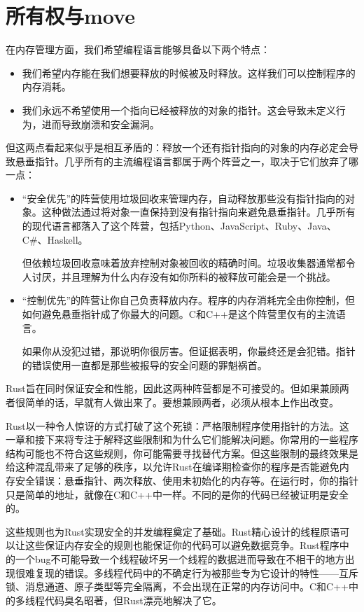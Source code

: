 \chapter{所有权与move}\label{ch04}

在内存管理方面，我们希望编程语言能够具备以下两个特点：
\begin{itemize}
    \item 我们希望内存能在我们想要释放的时候被及时释放。这样我们可以控制程序的内存消耗。
    \item 我们永远不希望使用一个指向已经被释放的对象的指针。这会导致未定义行为，进而导致崩溃和安全漏洞。
\end{itemize}

但这两点看起来似乎是相互矛盾的：释放一个还有指针指向的对象的内存必定会导致悬垂指针。几乎所有的主流编程语言都属于两个阵营之一，取决于它们放弃了哪一点：
\begin{itemize}
    \item “安全优先”的阵营使用垃圾回收来管理内存，自动释放那些没有指针指向的对象。这种做法通过将对象一直保持到没有指针指向来避免悬垂指针。几乎所有的现代语言都落入了这个阵营，包括Python、JavaScript、Ruby、Java、C\#、Haskell。

    但依赖垃圾回收意味着放弃控制对象被回收的精确时间。垃圾收集器通常都令人讨厌，并且理解为什么内存没有如你所料的被释放可能会是一个挑战。

    \item “控制优先”的阵营让你自己负责释放内存。程序的内存消耗完全由你控制，但如何避免悬垂指针成了你最大的问题。C和C++是这个阵营里仅有的主流语言。

    如果你从没犯过错，那说明你很厉害。但证据表明，你最终还是会犯错。指针的错误使用一直都是那些被报导的安全问题的罪魁祸首。
\end{itemize}

Rust旨在同时保证安全和性能，因此这两种阵营都是不可接受的。但如果兼顾两者很简单的话，早就有人做出来了。要想兼顾两者，必须从根本上作出改变。

Rust以一种令人惊讶的方式打破了这个死锁：严格限制程序使用指针的方法。这一章和接下来将专注于解释这些限制和为什么它们能解决问题。你常用的一些程序结构可能也不符合这些规则，你可能需要寻找替代方案。但这些限制的最终效果是给这种混乱带来了足够的秩序，以允许Rust在编译期检查你的程序是否能避免内存安全错误：悬垂指针、两次释放、使用未初始化的内存等。在运行时，你的指针只是简单的地址，就像在C和C++中一样。不同的是你的代码已经被证明是安全的。

这些规则也为Rust实现安全的并发编程奠定了基础。Rust精心设计的线程原语可以让这些保证内存安全的规则也能保证你的代码可以避免数据竞争。Rust程序中的一个bug不可能导致一个线程破坏另一个线程的数据进而导致在不相干的地方出现很难复现的错误。多线程代码中的不确定行为被那些专为它设计的特性——互斥锁、消息通道、原子类型等完全隔离，不会出现在正常的内存访问中。C和C++中的多线程代码臭名昭著，但Rust漂亮地解决了它。


